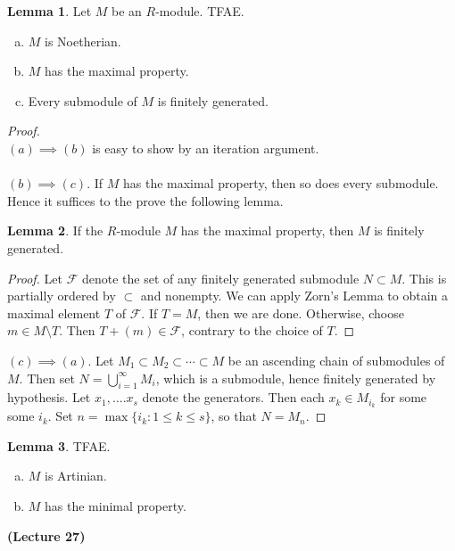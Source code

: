 \documentclass[10pt,letterpaper,cm]{nupset}
\theoremstyle{definition}
\newtheorem{lemma}{Lemma}
\newcommand{\1}{\mathbf{1}}
\newcommand{\0}{\vec 0}
\begin{document}
\begin{lemma} Let $M$ be an $R$-module. TFAE.
\begin{enumerate}[(a)]
\item $M$ is Noetherian.
\item $M$ has the maximal property. 
\item Every submodule of $M$ is finitely generated. 
\end{enumerate}
\end{lemma}
\begin{proof} $ $ \\
$(a) \implies (b)$ is easy to show by an iteration argument.
\\ \\ $(b) \implies (c)$. If $M$ has the maximal property, then so does every submodule. Hence it suffices to the prove the following lemma.
\begin{lemma}
If the $R$-module $M$ has the maximal property, then $M$ is finitely generated.
\end{lemma}
\begin{proof}
Let $\mathcal{F}$ denote the set of any finitely generated submodule $N\subset M$. This is partially ordered by $\subset$ and nonempty. We can apply Zorn's Lemma to obtain a maximal element $T$ of $\mathcal{F}$. If $T=M$, then we are done. Otherwise, choose $m\in M \setminus T$. Then $T + (m) \in \mathcal{F}$, contrary to the choice of $T$. 
\end{proof}
$(c) \implies (a)$. Let $M_1 \subset M_2 \subset \cdots \subset M$ be an ascending chain of submodules of $M$. Then set $N= \bigcup_{i=1}^{\infty} M_i$, which is a submodule, hence finitely generated by hypothesis. Let $x_1, \ldots. x_s$ denote the generators. Then each $x_k \in M_{i_k}$ for some some $i_k$. Set $n= \max\{i_k : 1\leq k \leq s\}$, so that $N = M_n$.
\end{proof}

\begin{lemma} TFAE.
\begin{enumerate}[(a)]
\item $M$ is Artinian.
\item $M$ has the minimal property.
\end{enumerate}
\end{lemma}

\begin{center}
{\textbf{(Lecture 27)}}
\end{center}
\end{document}
